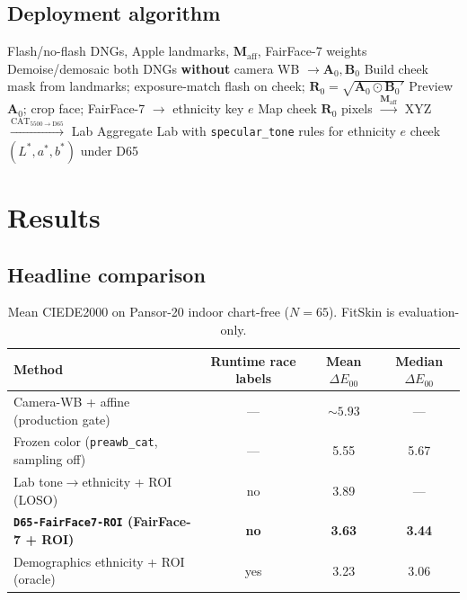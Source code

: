 \documentclass[11pt]{article}
\newcommand{\deee}{\ensuremath{\Delta E_{00}}}
\newcommand{\Maff}{\mathbf{M}_{\mathrm{aff}}}
\newcommand{\Rvec}{\mathbf{R}}
\newcommand{\pipename}{\texttt{D65-FairFace7-ROI}}
\begin{document}
\subsection{Deployment algorithm}
\begin{algorithm}[H]
\caption{\pipename{} inference (chart-free)}
\begin{algorithmic}[1]
\Require Flash/no-flash DNGs, Apple landmarks, $\Maff$, FairFace-7 weights
\State Demoise/demosaic both DNGs \textbf{without} camera WB $\to \mathbf{A}_0,\mathbf{B}_0$
\State Build cheek mask from landmarks; exposure-match flash on cheek; $\Rvec_0=\sqrt{\mathbf{A}_0\odot\mathbf{B}_0'}$
\State Preview $\mathbf{A}_0$; crop face; FairFace-7 $\to$ ethnicity key $e$
\State Map cheek $\Rvec_0$ pixels $\xrightarrow{\Maff}$ XYZ $\xrightarrow{\mathrm{CAT}_{5500\to\mathrm{D65}}}$ Lab
\State Aggregate Lab with \texttt{specular\_tone} rules for ethnicity $e$
\State \Return cheek $(L^*,a^*,b^*)$ under D65
\end{algorithmic}
\end{algorithm}

\section{Results}
\label{sec:results}

\subsection{Headline comparison}
\begin{table}[h]
\centering
\caption{Mean CIEDE2000 on Pansor-20 indoor chart-free ($N=65$). FitSkin is evaluation-only.}
\label{tab:headline}
\begin{tabular}{lccc}
\toprule
Method & Runtime race labels & Mean $\deee$ & Median $\deee$ \\
\midrule
Camera-WB + affine (production gate) & --- & ${\sim}5.93$ & --- \\
Frozen color (\texttt{preawb\_cat}, sampling off) & --- & 5.55 & 5.67 \\
Lab tone$\to$ethnicity + ROI (LOSO) & no & 3.89 & --- \\
\textbf{\pipename{} (FairFace-7 + ROI)} & \textbf{no} & \textbf{3.63} & \textbf{3.44} \\
Demographics ethnicity + ROI (oracle) & yes & 3.23 & 3.06 \\
\bottomrule
\end{tabular}
\end{table}
\end{document}
